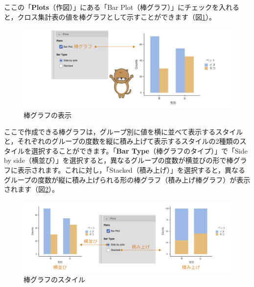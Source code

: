 \documentclass[
  12pt,
  a5jpaper,
  lualatex, ja=standard]{bxjsbook}
\begin{document}
ここの「\textbf{Plots}（作図）」にある「Bar Plot（棒グラフ）」にチェックを入れると，クロス集計表の値を棒グラフとして示すことができます（図\ref{fig:frequencies-chisq-plots-bar}）。

\begin{figure}[!ht]

{\centering \includegraphics[width=1\linewidth]{images/frequencies/chisq-plots-bar} 

}

\caption{棒グラフの表示}\label{fig:frequencies-chisq-plots-bar}
\end{figure}

ここで作成できる棒グラフは，グループ別に値を横に並べて表示するスタイルと，それぞれのグループの度数を縦に積み上げて表示するスタイルの2種類のスタイルを選択することができます。「\textbf{Bar Type}（棒グラフのタイプ）」で「Side by side（横並び）」を選択すると，異なるグループの度数が横並びの形で棒グラフに表示されます。これに対し，「Stacked（積み上げ）」を選択すると，異なるグループの度数が縦に積み上げられる形の棒グラフ（積み上げ棒グラフ）が表示されます（図\ref{fig:frequencies-chisq-plots-bar-stack}）。

\begin{figure}[!ht]

{\centering \includegraphics[width=1\linewidth]{images/frequencies/chisq-plots-bar-stack} 

}

\caption{棒グラフのスタイル}\label{fig:frequencies-chisq-plots-bar-stack}
\end{figure}
\end{document}

